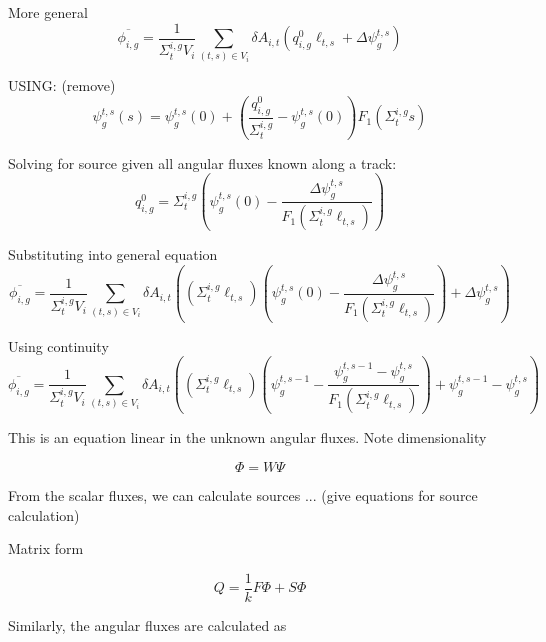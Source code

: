 More general
\begin{dmath}
	\overline{\phi_{i,g}} = \frac{1}{\Sigma_{t}^{i,g} V_i} \sum_{(t,s) \in V_i} \delta A_{i,t} \left( q^0_{i,g} \ell_{t,s} + \Delta \psi_g^{t,s} \right)
\end{dmath}


USING: (remove)
\begin{dmath}
	\psi_g^{t,s}(s) = \psi^{t,s}_g(0) + \left( \frac{q^0_{i,g}}{\Sigma_{t}^{i,g}} - \psi_g^{t,s}(0) \right) F_1\left(\Sigma_{t}^{i,g} s \right)
\end{dmath}


Solving for source given all angular fluxes known along a track:
\begin{dmath}
	q^0_{i,g} = \Sigma_{t}^{i,g} \left( \psi_g^{t,s}(0) - \frac{\Delta \psi_g^{t,s}}{F_1\left(\Sigma_{t}^{i,g} \ell_{t,s} \right)}  \right) 
\end{dmath}

Substituting into general equation
\begin{dmath}
	\overline{\phi_{i,g}} = \frac{1}{\Sigma_{t}^{i,g} V_i} \sum_{(t,s) \in V_i} \delta A_{i,t} \left( \left( \Sigma_{t}^{i,g} \ell_{t,s} \right) \left( \psi_g^{t,s}(0) - \frac{\Delta \psi_g^{t,s}}{F_1\left(\Sigma_{t}^{i,g} \ell_{t,s} \right)}  \right) + \Delta \psi_g^{t,s} \right)
\end{dmath}

Using continuity
\begin{dmath}
	\overline{\phi_{i,g}} = \frac{1}{\Sigma_{t}^{i,g} V_i} \sum_{(t,s) \in V_i} \delta A_{i,t} \left( \left( \Sigma_{t}^{i,g} \ell_{t,s} \right) \left( \psi_g^{t,s-1} - \frac{\psi_g^{t,s-1} - \psi_g^{t,s}}{F_1\left(\Sigma_{t}^{i,g} \ell_{t,s} \right)}  \right) + \psi_g^{t,s-1} - \psi_g^{t,s} \right)
\end{dmath}


This is an equation linear in the unknown angular fluxes. Note dimensionality

\begin{dmath}
	\Phi = W \Psi
\end{dmath}

From the scalar fluxes, we can calculate sources ... (give equations for source calculation)

Matrix form

\begin{dmath}
	Q = \frac{1}{k} F \Phi + S \Phi
\end{dmath}


Similarly, the angular fluxes are calculated as

